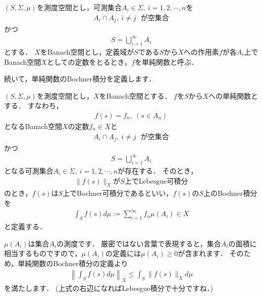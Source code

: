\begin{defi}[単純関数]\label{def:simple_function}
$(S, \Sigma, \mu)$を測度空間とし，可測集合$A_i \in \Sigma, ~ i = 1, 2, \cdots, n$を
\begin{align*}
A_i \cap A_j, ~ i \neq j ~~  ~ \mbox{が空集合}
\end{align*}
かつ
\begin{align*}
S = \bigcup_{i = 1}^{ \infty } A_i
\end{align*}
とする．
$X$をBanach空間とし，定義域が$S$である$S$から$X$への作用素$f$が各$A_i$上でBanach空間$X$としての定数をとるとき，$f$を単純関数と呼ぶ．
\end{defi}

続いて，単純関数のBochner積分を定義します．

\begin{defi}[単純関数のBochner積分]\label{def:bochner_integral_for_simple_function}
$(S, \Sigma, \mu)$を測度空間とし，$X$をBanach空間とする．
$f$を$S$から$X$への単純関数とする．
すなわち，
\begin{align*}
f(s) = f_n, ~ (s \in A_n) 
\end{align*}
となるBanach空間$X$の定数$f_n \in X$と
\begin{align*}
A_i \cap A_j, ~ i \neq j ~~  ~ \mbox{が空集合}
\end{align*}
かつ
\begin{align*}
S = \bigcup_{i = 1}^{ \infty } A_i
\end{align*}
となる可測集合$A_i \in \Sigma, ~ i = 1, 2, \cdots, n$が存在する．
そのとき，
\begin{align*}
 \| f(s) \|_{X} \mbox{が}S\mbox{上でLebesgue可積分}
\end{align*}
のとき，$f(s)$は$S$上でBochner可積分であるといい，$f(s)$の$S$上のBochner積分を
\begin{align*}
 \int_S f(s) d \mu := \sum_{i = 1}^{\infty} f_n \mu(A_i) \in X
\end{align*}
と定義する．
\end{defi}

$\mu(A_i)$は集合$A_i$の測度です．
厳密ではない言葉で表現すると，集合$A_i$の面積に相当するものですので，$\mu(A_i)$の定義には$\mu(A_i) \ge 0$が含まれます．
そのため，単純関数のBochner積分の定義より
\begin{align*}
 \left\| \int_S f(s) d \mu \right\|_{X} \le \int_S \| f(s) \|_{X} d \mu
\end{align*}
を満たします．
(上式の右辺になればLebesgue積分で十分ですね．)

